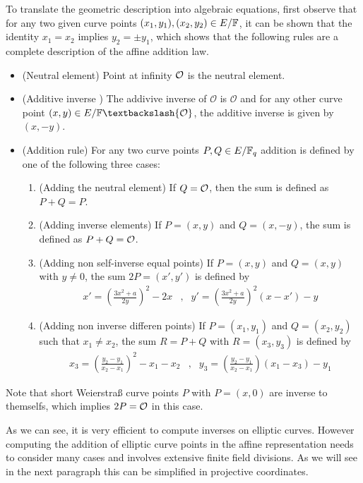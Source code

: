 To translate the geometric description into algebraic equations, first observe that for any two given curve points $(x_1,y_1), (x_2,y_2)\in E/\mathbb{F}$, it can be shown that the identity $x_1=x_2$ implies $y_2=\pm y_1$, which shows that the following rules are a complete description of the affine addition law.
\begin{itemize}
\item (Neutral element) Point at infinity $\mathcal{O}$ is the neutral element.
\item (Additive inverse ) The addivive inverse of $\mathcal{O}$ is $\mathcal{O}$ and for any other curve point $(x,y) \in E/\F\textbackslash \{\mathcal{O}\}$, the additive inverse is given by $(x,-y)$.
\item (Addition rule) For any two curve points $P, Q \in E/\mathbb{F}_q$ addition is defined by one of the following three cases:
\begin{enumerate}
\item (Adding the neutral element) If $Q=\mathcal{O}$, then the sum is defined as $P+Q=P$.
\item (Adding inverse elements)  If $P=(x,y)$ and $Q=(x,-y)$, the sum is defined as $P+Q=\mathcal{O}$.
\item (Adding non self-inverse equal points) If $P=(x,y)$ and $Q=(x,y)$ with $y\neq 0$, the sum $2P=(x',y')$ is defined by
$$
\begin{array}{llr}
x' = \left(\frac{3x^2+a}{2y}\right)^2 -2x &,&
y' = \left(\frac{3x^2+a}{2y}\right)^2\left(x-x'\right) - y
\end{array} 
$$
\item (Adding non inverse differen points) If $P=(x_1,y_1)$ and $Q=(x_2,y_2)$ such that $x_1 \neq x_2$, the sum $R=P+Q$ with $R=(x_3,y_3)$ is defined by
$$
\begin{array}{llr}
x_3 = \left(\frac{y_2-y_1}{x_2-x_1}\right)^2 -x_1-x_2 &, &
y_3 = \left(\frac{y_2-y_1}{x_2-x_1} \right)\left(x_1-x_3\right) - y_1
\end{array} 
$$
\end{enumerate}
 
\end{itemize} 
Note that short Weierstraß curve points $P$ with $P=(x,0)$ are inverse to themselfs, which implies $2P=\mathcal{O}$ in this case.

As we can see, it is very efficient to compute inverses on elliptic curves. However computing the addition of elliptic curve points in the affine representation needs to consider many cases and involves extensive finite field divisions. As we will see in the next paragraph this can be simplified in projective coordinates.

